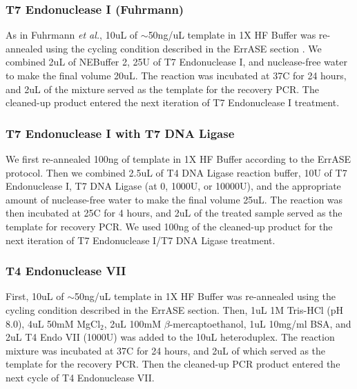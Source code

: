 \documentclass[twocolumn]{article}
\begin{document}
\subsubsection*{T7 Endonuclease I (Fuhrmann)}
As in Fuhrmann \textit{et al.}, 10uL of $\sim$50ng/uL template in 1X HF Buffer was re-annealed using the cycling condition described in the ErrASE section \cite{fuhrmann2005}. We combined 2uL of NEBuffer 2, 25U of T7 Endonuclease I, and nuclease-free water to make the final volume 20uL. The reaction was incubated at 37C for 24 hours, and 2uL of the mixture served as the template for the recovery PCR. The cleaned-up product entered the next iteration of T7 Endonuclease I treatment.

\subsubsection*{T7 Endonuclease I with T7 DNA Ligase}
We first re-annealed 100ng of template in 1X HF Buffer according to the ErrASE protocol. Then we combined 2.5uL of T4 DNA Ligase reaction buffer, 10U of T7 Endonuclease I, T7 DNA Ligase (at 0, 1000U, or 10000U), and the appropriate amount of nuclease-free water to make the final volume 25uL. The reaction was then incubated at 25C for 4 hours, and 2uL of the treated sample served as the template for recovery PCR. We used 100ng of the cleaned-up product for the next iteration of T7 Endonuclease I/T7 DNA Ligase treatment.

\subsubsection*{T4 Endonuclease VII}
First, 10uL of $\sim$50ng/uL template in 1X HF Buffer was re-annealed using the cycling condition described in the ErrASE section. Then, 1uL 1M Tris-HCl (pH 8.0), 4uL 50mM MgCl$_2$, 2uL 100mM $\beta$-mercaptoethanol, 1uL 10mg/ml BSA, and 2uL T4 Endo VII (1000U) was added to the 10uL heteroduplex. The reaction mixture was incubated at 37C for 24 hours, and 2uL of which served as the template for the recovery PCR. Then the cleaned-up PCR product entered the next cycle of T4 Endonuclease VII.
\end{document}
